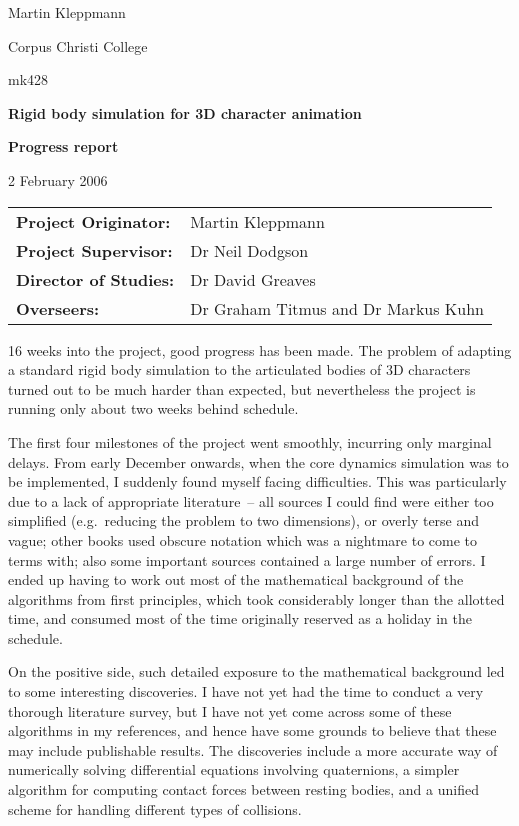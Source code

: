 \documentclass{article}
\begin{document}
\pagestyle{empty}
{\hfill Martin Kleppmann}

{\hfill Corpus Christi College}

{\hfill mk428}

\vspace{1.5cm}
\centerline{\Large\bf Rigid body simulation for 3D character animation}
\vspace{0.5cm}
\centerline{\large\bf Progress report}
\vspace{0.5cm}
\centerline{2 February 2006}

\vspace{1.5cm}
\begin{tabular}{ll}
{\bf Project Originator:} & Martin Kleppmann\\
{\bf Project Supervisor:} & Dr Neil Dodgson\\
{\bf Director of Studies:} & Dr David Greaves\\
{\bf Overseers:} & Dr Graham Titmus and Dr Markus Kuhn\\
\end{tabular}
\vspace{1.5cm}

16 weeks into the project, good progress has been made. The problem of adapting a standard
rigid body simulation to the articulated bodies of 3D characters turned out to be much harder than
expected, but nevertheless the project is running only about two weeks behind schedule.

The first four milestones of the project went smoothly, incurring only marginal delays. From early
December onwards, when the core dynamics simulation was to be implemented, I suddenly found myself
facing difficulties. This was particularly due to a lack of appropriate literature~--
all sources I could find were either too simplified (e.g.\ reducing the problem to two
dimensions), or overly terse and vague; other books used obscure notation which was a nightmare
to come to terms with; also some important sources contained a large number of errors.  I ended
up having to work out most of the mathematical background of the algorithms from first principles,
which took considerably longer than the allotted time, and consumed most of the time originally
reserved as a holiday in the schedule.

On the positive side, such detailed exposure to the mathematical background led to some interesting
discoveries. I have not yet had the time to conduct a very thorough literature survey, but I
have not yet come across some of these algorithms in my references, and hence have some grounds to
believe that these may include publishable results. The discoveries include a more accurate way of
numerically solving differential equations involving quaternions, a simpler algorithm for computing
contact forces between resting bodies, and a unified scheme for handling different types of
collisions.
\end{document}
